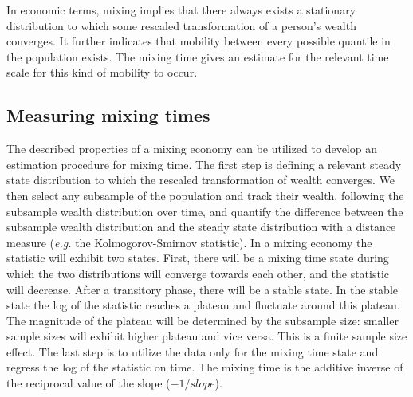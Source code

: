 \documentclass[11pt]{article}
\newcommand{\ie}{{\it i.e.}\xspace}
\newcommand{\eg}{{\it e.g.}\xspace}
\numberwithin{equation}{section}
\begin{document}
In economic terms, mixing implies that there always exists a stationary distribution to which some rescaled transformation of a person's wealth converges. It further indicates that mobility between every possible quantile in the population exists. The mixing time gives an estimate for the relevant time scale for this kind of mobility to occur.



\subsection{Measuring mixing times}


The described properties of a mixing economy can be utilized to develop an estimation procedure for mixing time. The first step is defining a relevant steady state distribution to which the rescaled transformation of wealth converges. We then select any subsample of the population and track their wealth, following the subsample wealth distribution over time, and quantify the difference between the subsample wealth distribution and the steady state distribution with a distance measure (\eg the Kolmogorov-Smirnov statistic). In a mixing economy the statistic will exhibit two states. First, there will be a mixing time state during which the two distributions will converge towards each other, and the statistic will decrease. After a transitory phase, there will be a stable state. In the stable state the log of the statistic reaches a plateau and fluctuate around this plateau. The magnitude of the plateau will be determined by the subsample size: smaller sample sizes will exhibit higher plateau and vice versa. This is a finite sample size effect. The last step is to utilize the data only for the mixing time state and regress the log of the statistic on time. The mixing time is the additive inverse of the reciprocal value of the slope ($-1/slope$).
\end{document}
